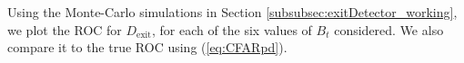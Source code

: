 \documentclass[11pt]{article}
\begin{document}
Using the Monte-Carlo simulations in Section \ref{subsubsec:exitDetector_working}, we plot the ROC for $D_{\text{exit}}$, for each of the six values of $B_{t}$ considered. We also compare it to the true ROC using (\ref{eq:CFARpd}).
\begin{figure}[h!]
\centering
{}

\end{figure}
\end{document}

